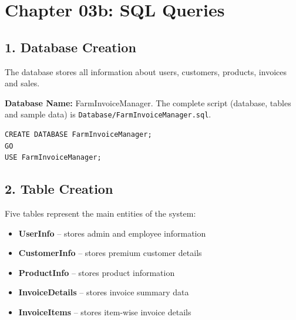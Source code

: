\documentclass[12pt,a4paper]{article}
\begin{document}
\section{Chapter 03b: SQL Queries}\label{ch:sql}

\subsection{1. Database Creation}
The database stores all information about users, customers, products, invoices and sales.

\textbf{Database Name:} FarmInvoiceManager. The complete script (database, tables and sample data) is \texttt{Database/FarmInvoiceManager.sql}.
\begin{lstlisting}
CREATE DATABASE FarmInvoiceManager;
GO
USE FarmInvoiceManager;
\end{lstlisting}

\subsection{2. Table Creation}
Five tables represent the main entities of the system:
\begin{itemize}
\item \textbf{UserInfo} -- stores admin and employee information
\item \textbf{CustomerInfo} -- stores premium customer details
\item \textbf{ProductInfo} -- stores product information
\item \textbf{InvoiceDetails} -- stores invoice summary data
\item \textbf{InvoiceItems} -- stores item-wise invoice details
\end{itemize}
\end{document}
